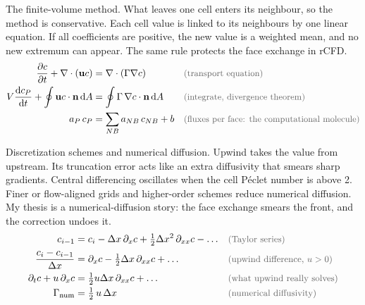 \begin{qabox}{The finite-volume method.}
\explain What leaves one cell enters its neighbour, so the method is conservative. Each cell value
is linked to its neighbours by one linear equation. If all coefficients are positive, the new value
is a weighted mean, and no new extremum can appear. The same rule protects the face exchange in
rCFD.
\derive
\begin{align*}
\frac{\partial c}{\partial t} + \nabla\cdot(\mathbf{u}c) &= \nabla\cdot(\Gamma\nabla c) \why{transport equation} \\
V\frac{\mathrm{d}c_P}{\mathrm{d}t} + \oint\mathbf{u}c\cdot\mathbf{n}\,\mathrm{d}A &= \oint\Gamma\,\nabla c\cdot\mathbf{n}\,\mathrm{d}A \why{integrate, divergence theorem} \\
a_P\,c_P &= \sum_{NB} a_{NB}\,c_{NB} + b \why{fluxes per face: the computational molecule}
\end{align*}
\end{qabox}

\begin{qabox}{Discretization schemes and numerical diffusion.}
\explain Upwind takes the value from upstream. Its truncation error acts like an extra diffusivity
that smears sharp gradients. Central differencing oscillates when the cell P\'eclet number is above
2. Finer or flow-aligned grids and higher-order schemes reduce numerical diffusion. My thesis is a
numerical-diffusion story: the face exchange smears the front, and the correction undoes it.
\derive
\begin{align*}
c_{i-1} &= c_i - \Delta x\,\partial_x c + \tfrac12\Delta x^2\,\partial_{xx}c - \dots \why{Taylor series} \\
\frac{c_i - c_{i-1}}{\Delta x} &= \partial_x c - \tfrac12\Delta x\,\partial_{xx}c + \dots \why{upwind difference, $u > 0$} \\
\partial_t c + u\,\partial_x c &= \tfrac12 u\Delta x\,\partial_{xx}c + \dots \why{what upwind really solves} \\
\Gamma_{\mathrm{num}} &= \tfrac12\,u\,\Delta x \why{numerical diffusivity}
\end{align*}
\end{qabox}

